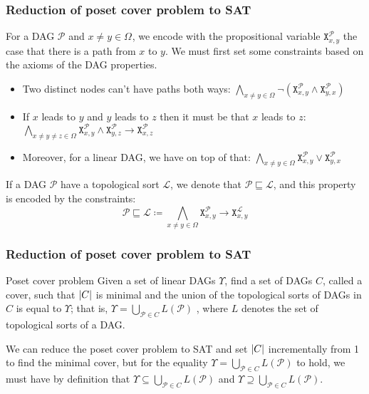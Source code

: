 \documentclass{beamer}
\DeclarePairedDelimiter{\abs}{\lvert}{\rvert}
\renewcommand{\implies}{\rightarrow}
\newcommand{\poset}[1]{\mathcal{#1}}
\newcommand{\uni}[1][]{\Omega_{#1}}
\newcommand{\lang}[1]{L(#1)}
\newcommand{\lext}{\sqsubseteq}
\newcommand{\satvar}[2]{\mathtt{X}_{#1}^{#2}}
\begin{document}
\begin{frame}
    \frametitle{Reduction of poset cover problem to SAT}
    For a DAG $\poset{P}$ and $x \!\neq\! y \!\in\! \uni$,
    we encode with the propositional variable
    $\satvar{x,y}{\poset{P}}$ the case that
    there is a path from
    $x$ to $y$. We
    must first set some constraints based on the axioms
    of the DAG properties.
    \begin{itemize}
        \item Two distinct nodes can't have paths both ways:
        $
        \bigwedge_{x \neq y \in \uni} \neg (\satvar{x,y}{\poset{P}} \wedge \satvar{y,x}{\poset{P}})
        $
        \item If $x$ leads to $y$ and $y$ leads to $z$
        then it must be that $x$ leads to $z$:
        $
        \bigwedge_{x \neq y \neq z \in \uni}
        \satvar{x,y}{\poset{P}} \wedge \satvar{y,z}{\poset{P}} \implies \satvar{x,z}{\poset{P}}
        $
        \item Moreover, for a linear DAG, we have
        on top of that:
        $
        \bigwedge_{x \neq y \in \uni} \satvar{x,y}{\poset{P}} \vee \satvar{y,x}{\poset{P}}
        $
    \end{itemize}
    If a DAG $\poset{P}$ have a topological sort $\poset{L}$,
    we denote that $\poset{P} \lext \poset{L}$, and this property
    is encoded by the constraints:
    \[
    \poset{P} \lext \poset{L} \coloneqq
    \bigwedge_{x \neq y \in \uni} \satvar{x,y}{\poset{P}}
    \implies \satvar{x,y}{\poset{L}}
    \]
\end{frame}

\begin{frame}
    \frametitle{Reduction of poset cover problem to SAT}
    \begin{block}{Poset cover problem}
        Given a set of linear DAGs $\Upsilon$,
        find a set of DAGs $C$, called a cover,
        such that $\abs{C}$ is minimal and the union
        of the topological sorts of DAGs in $C$ is equal
        to $\Upsilon$; that is,
        $\Upsilon = \bigcup_{\poset{P} \in C} \lang{\poset{P}}$
        , where $L$ denotes the set of topological sorts of a DAG.
    \end{block}
    We can reduce the poset cover problem to SAT and set $\abs{C}$
    incrementally from 1 to find the minimal cover, but for the equality
    $\Upsilon = \bigcup_{\poset{P} \in C} \lang{\poset{P}}$ to hold,
    we must have by definition that
    $\Upsilon \subseteq \bigcup_{\poset{P} \in C} \lang{\poset{P}}$
    and
    $\Upsilon \supseteq \bigcup_{\poset{P} \in C} \lang{\poset{P}}$.
\end{frame}
\end{document}
